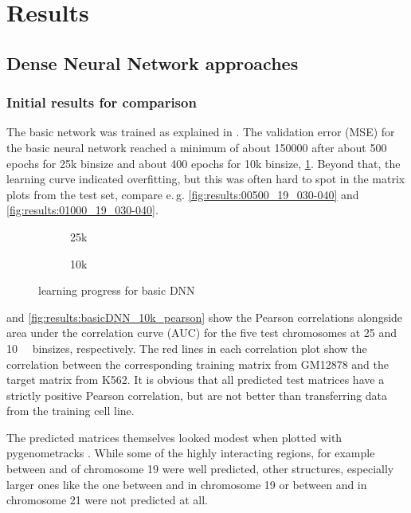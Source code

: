 \section{Results}
\subsection{Dense Neural Network approaches} \label{sec:results:DNN}

\subsubsection{Initial results for comparison} \label{sec:initialDNNresults}
The basic network was trained as explained in \xxx.
The validation error (MSE) for the basic neural network reached a minimum of about \SI{150000}{} 
after about 500 epochs for 25k binsize and about 400 epochs for 10k binsize, \cref{fig:results:basicDNN_lossEpochs}.
Beyond that, the learning curve indicated overfitting, but this was often hard to spot in the matrix plots from the test set, 
compare e.\,g. \cref{fig:results:00500_19_030-040} and \ref{fig:results:01000_19_030-040}.
\begin{figure}[hbp]
 \begin{subfigure}{0.45\textwidth}
 \caption{25k}
 \end{subfigure}\hfill
 \begin{subfigure}{0.45\textwidth}
 \caption{10k}
 \end{subfigure}
 \caption{learning progress for basic DNN} \label{fig:results:basicDNN_lossEpochs}
\end{figure}


 and \cref{fig:results:basicDNN_10k_pearson} show the Pearson correlations alongside area under the correlation curve (AUC) for the five test chromosomes
at 25 and \SI{10}{\kilo\bp} binsizes, respectively.
The red lines in each correlation plot show the correlation between the corresponding training matrix from GM12878 and the target matrix from K562.
It is obvious that all predicted test matrices have a strictly positive Pearson correlation, but are not better than transferring data from the training cell line.

The predicted matrices themselves looked modest when plotted with pygenometracks \xxx. 
While some of the highly interacting regions, for example between \xxx and \xxx of chromosome 19 were
well predicted, other structures, especially larger ones like the one between \xxx and \xxx in chromosome 19 
or between \xxx and \xxx in chromosome 21 were not predicted at all.

